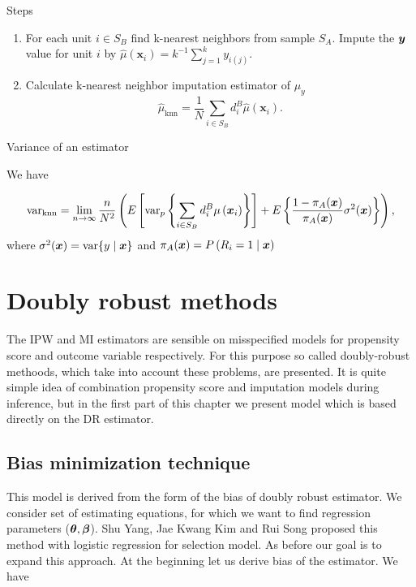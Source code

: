 \documentclass[
  letterpaper,
  DIV=11,
  numbers=noendperiod]{scrreprt}
\providecommand{\tightlist}{%
  \setlength{\itemsep}{0pt}\setlength{\parskip}{0pt}}\usepackage{longtable,booktabs,array}
\begin{document}
Steps

\begin{enumerate}
\def\labelenumi{\arabic{enumi}.}
\tightlist
\item
  For each unit \(i \in S_B\) find k-nearest neighbors from sample
  \(S_A\). Impute the \(\boldsymbol{y}\) value for unit \(i\) by
  \(\hat{\mu}\left(\mathbf{x}_i\right)=k^{-1} \sum_{j=1}^k y_{i(j)}\).
\item
  Calculate k-nearest neighbor imputation estimator of \(\mu_y\) \[
  \hat{\mu}_{\mathrm{knn}}=\frac{1}{N} \sum_{i \in S_B} d_i^B \hat{\mu}\left(\mathbf{x}_i\right) .
  \]
\end{enumerate}

Variance of an estimator

We have

\[
\text{var}_{\mathrm{knn}}=\lim _{n \rightarrow \infty} \frac{n}{N^2}\left(E\left[\operatorname{var}_p\left\{\sum_{i \in S_B} d_i^B \mu\left(\boldsymbol{x}_i\right)\right\}\right]+E\left\{\frac{1-\pi_A(\boldsymbol{x})}{\pi_A(\boldsymbol{x})} \sigma^2(\boldsymbol{x})\right\}\right),
\] where \(\sigma^2(\boldsymbol{x})=\operatorname{var}\{y \mid \boldsymbol{x}\}\) and
\(\pi_A(\boldsymbol{x}) = P\left(R_i=1 \mid \boldsymbol{x}\right)\)


\chapter{Doubly robust methods}\label{doubly-robust-methods}

The IPW and MI estimators are sensible on misspecified models for
propensity score and outcome variable respectively. For this purpose so
called doubly-robust methoods, which take into account these problems,
are presented. It is quite simple idea of combination propensity score
and imputation models during inference, but in the first part of this
chapter we present model which is based directly on the DR estimator.

\section{Bias minimization technique}\label{bias-minimization-technique}

This model is derived from the form of the bias of doubly robust
estimator. We consider set of estimating equations, for which we want to
find regression parameters (\(\boldsymbol{\theta}, \boldsymbol{\beta}\)). Shu Yang, Jae Kwang
Kim and Rui Song proposed this method with logistic regression for
selection model. As before our goal is to expand this approach. At the
beginning let us derive bias of the estimator. We have
\end{document}

